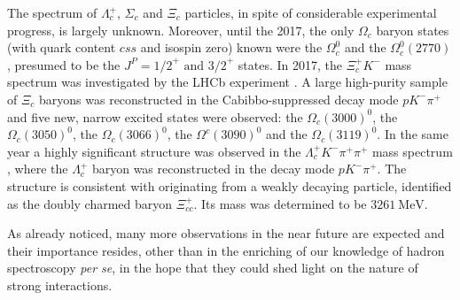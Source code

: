 The spectrum of $\Lambda_c^+$, $\Sigma_c$ and $\Xi_c$ particles, in spite of considerable experimental progress, is largely unknown. Moreover, until the 2017, the only $\Omega_c$ baryon states (with quark content $css$ and isospin zero) known were the $\Omega_c^0$ and the $\Omega_c^0(2770)$, presumed to be the $J^P = \left. 1/2 \right.^+ \text{ and } \left. 3/2 \right.^+$ states. In 2017, the $\Xi_c^+ K^-$ mass spectrum was investigated by the LHCb experiment \cite{Aaij:2017nav}. A large high-purity sample of $\Xi_c$ baryons was reconstructed in the Cabibbo-suppressed decay mode $p K^- \pi^+$ and five new, narrow excited states were observed: the $\Omega_c(3000)^0$, the $\Omega_c(3050)^0$, the $\Omega_c(3066)^0$, the $\Omega^c(3090)^0$ and the $\Omega_c(3119)^0$. In the same year a highly significant structure was observed in the $\Lambda_c^+ K^- \pi^+ \pi^+$ mass spectrum \cite{Aaij:2017ueg}, where the $\Lambda^+_c$ baryon was reconstructed in the decay mode $p K^- \pi^+$. The structure is consistent with originating from a weakly decaying particle, identified as the doubly charmed baryon $\Xi_{cc}^+$. Its mass was determined to be $3261 \ \text{MeV}$.

As already noticed, many more observations in the near future are expected and their importance resides, other than in the enriching of our knowledge of hadron spectroscopy \emph{per se}, in the hope that they could shed light on the nature of strong interactions.

